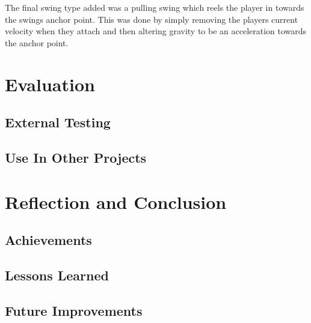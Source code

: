 \documentclass[]{report}
\begin{document}
			The final swing type added was a pulling swing which reels the player in towards the swings anchor point. This was done by simply removing the players current velocity when they attach and then altering gravity to be an acceleration towards the anchor point.
		

\chapter{Evaluation}
	\section{External Testing}
	\section{Use In Other Projects}
	

\chapter{Reflection and Conclusion}
	\section{Achievements}
	\section{Lessons Learned}
	\section{Future Improvements}
	



\end{document}
